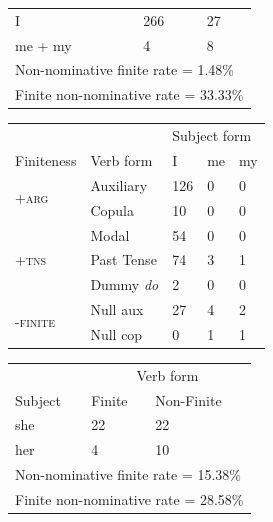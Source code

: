 \begin{table}[!h]
\begin{minipage}[t]{0.5\textwidth}
\begin{tabular}{@{}lll@{}}
        \midrule
        I & 266 & 27 \\
        me + my  & 4 & 8\\
        \hline
         \multicolumn{3}{l}{Non-nominative finite rate = 1.48\%} \\
         \multicolumn{3}{l}{Finite non-nominative rate = 33.33\%}\\
        \bottomrule
    \end{tabular}
\end{minipage}
\vspace{1ex}
   \begin{minipage}[t]{0.5\textwidth}
    \centering
    \small
    \begin{tabular}{lllll}
    \toprule
 &  & \multicolumn{3}{l}{Subject form} \\ \cline{3-5} 
Finiteness & Verb form & I & me & my \\ \hline
\multirow{2}{*}{\textsc{+arg}} & Auxiliary & 126 & 0 & 0 \\
 & Copula & 10 & 0 & 0 \\ \hline
\multirow{3}{*}{\textsc{+tns}} & Modal & 54 & 0 & 0 \\
 & Past Tense & 74 & 3 & 1 \\
 & Dummy \textit{do} & 2 & 0 & 0 \\ \hline
\multirow{2}{*}{\textsc{-finite}} & Null aux & 27 & 4 & 2 \\
 & Null cop & 0 & 1 & 1\\
\bottomrule
\end{tabular}
\end{minipage}
\textbf{\linebreak}
\begin{minipage}[t]{0.5\textwidth}
    \centering
    \small
    \begin{tabular}{@{}lll@{}}
        \toprule
         & \multicolumn{2}{c}{Verb form}\\
         \cline{2-3}
        Subject & Finite & Non-Finite \\
        \midrule
        she & 22  & 22  \\
        her  & 4  & 10\\
        \hline
 \multicolumn{3}{l}{Non-nominative finite rate = 15.38\%} \\
\multicolumn{3}{l}{Finite non-nominative rate = 28.58\%}\\
        \bottomrule
    \end{tabular}

\end{minipage}
\end{table}
